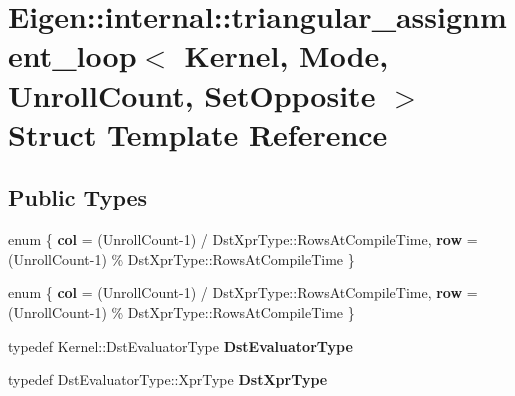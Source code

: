 \hypertarget{struct_eigen_1_1internal_1_1triangular__assignment__loop}{}\section{Eigen\+:\+:internal\+:\+:triangular\+\_\+assignment\+\_\+loop$<$ Kernel, Mode, Unroll\+Count, Set\+Opposite $>$ Struct Template Reference}
\label{struct_eigen_1_1internal_1_1triangular__assignment__loop}
\subsection*{Public Types}
\begin{DoxyCompactItemize}
\item 
\mbox{\label{struct_eigen_1_1internal_1_1triangular__assignment__loop_a8150aaa84a542550f3c08bd7569ad5e6}} 
enum \{ {\bfseries col} = (Unroll\+Count-\/1) / Dst\+Xpr\+Type\+:\+:Rows\+At\+Compile\+Time, 
{\bfseries row} = (Unroll\+Count-\/1) \% Dst\+Xpr\+Type\+:\+:Rows\+At\+Compile\+Time
 \}
\item 
\mbox{\label{struct_eigen_1_1internal_1_1triangular__assignment__loop_ad424ee9369509516abbdc2683b691e0d}} 
enum \{ {\bfseries col} = (Unroll\+Count-\/1) / Dst\+Xpr\+Type\+:\+:Rows\+At\+Compile\+Time, 
{\bfseries row} = (Unroll\+Count-\/1) \% Dst\+Xpr\+Type\+:\+:Rows\+At\+Compile\+Time
 \}
\item 
\mbox{\label{struct_eigen_1_1internal_1_1triangular__assignment__loop_ad3b34b01e072c973b4ae85356f9984a1}} 
typedef Kernel\+::\+Dst\+Evaluator\+Type {\bfseries Dst\+Evaluator\+Type}
\item 
\mbox{\label{struct_eigen_1_1internal_1_1triangular__assignment__loop_ab2f24d7211c8c3c2f3dad07ebfff4848}} 
typedef Dst\+Evaluator\+Type\+::\+Xpr\+Type {\bfseries Dst\+Xpr\+Type}
\item 
\mbox{\label{struct_eigen_1_1internal_1_1triangular__assignment__loop_a47a7999acf8ec526cce8fb63c6c49ab9}} 

\end{DoxyCompactItemize}
